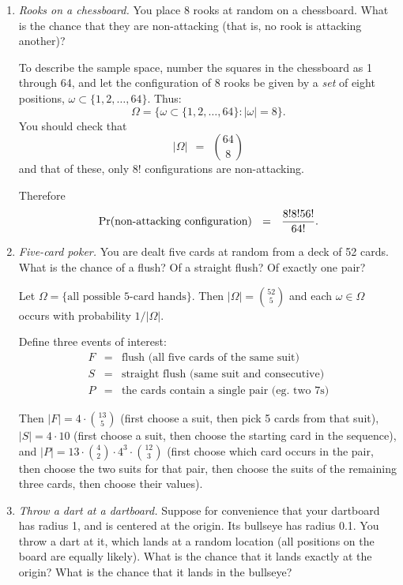 \begin{enumerate}
\item {\it Rooks on a chessboard.} You place 8 rooks at random on a chessboard. What is the chance that they are non-attacking (that is, no rook is attacking another)?

To describe the sample space, number the squares in the chessboard as 1 through 64, and let the configuration of 8 rooks be given by a {\it set} of eight positions, $\omega \subset \{1,2,\ldots,64\}$. Thus:
$$\Omega = \{\omega \subset \{1,2,\ldots,64\}: |\omega| = 8 \} .$$
You should check that 
$$ |\Omega| \ \ = \ \ {64 \choose 8} $$
and that of these, only 8! configurations are non-attacking. 

Therefore
$$ \mbox{\rm Pr}(\mbox{non-attacking configuration}) \ \ = \ \ \frac{8!8!56!}{64!} .$$

\item {\it Five-card poker.} You are dealt five cards at random from a deck of 52 cards. What is the chance of a flush? Of a straight flush? Of exactly one pair?

Let $\Omega = \{\mbox{all possible 5-card hands}\}$. Then $|\Omega| = {52 \choose 5}$ and each $\omega \in \Omega$ occurs with probability $1/|\Omega|$. 

Define three events of interest: 
\begin{eqnarray*}
F & = & \mbox{flush (all five cards of the same suit)} \\
S & = & \mbox{straight flush (same suit and consecutive)} \\
P & = & \mbox{the cards contain a single pair (eg. two 7s)}
\end{eqnarray*}

Then $|F| = 4 \cdot {13 \choose 5}$ (first choose a suit, then pick 5 cards from that suit), $|S| = 4 \cdot 10$ (first choose a suit, then choose the starting card in the sequence), and $|P| = 13 \cdot {4 \choose 2} \cdot 4^3 \cdot {12 \choose 3}$ (first choose which card occurs in the pair, then choose the two suits for that pair, then choose the suits of the remaining three cards, then choose their values).

\item {\it Throw a dart at a dartboard.} Suppose for convenience that your dartboard has radius 1, and is centered at the origin. Its bullseye has radius 0.1. You throw a dart at it, which lands at a random location (all positions on the board are equally likely). What is the chance that it lands exactly at the origin? What is the chance that it lands in the bullseye?


\end{enumerate}
